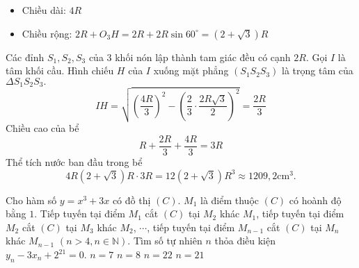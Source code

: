 \begin{ex}
{\begin{itemize}
\item Chiều dài: $4R$
\item Chiều rộng: $2R+O_3H=2R+2R\sin 60^ \circ=(2+ \sqrt{3})R$
\end{itemize}
Các đỉnh $S_1,S_2,S_3$ của $3$ khối nón lập thành tam giác đều có cạnh $2R$. Gọi $I$ là tâm khối cầu. Hình chiếu $H$ của $I$ xuống mặt phẳng $(S_1 S_2 S_3)$ là trọng tâm của $\Delta S_1 S_2 S_3.$\\
$$IH=\sqrt{\left( \dfrac{4R}{3}\right)^2- \left( \dfrac{2}{3}\cdot \dfrac{2R\sqrt{3}}{2}\right)^2}=\dfrac{2R}{3}$$
Chiều cao của bể $$R+\dfrac{2R}{3}+\dfrac{4R}{3}=3R$$
Thể tích nước ban đầu trong bể
$$4R(2+\sqrt{3})R \cdot 3R=12(2+\sqrt{3})R^3 \approx 1209{,}2 \mathrm{cm} ^3.$$
}
\end{ex}
\begin{ex}%
Cho hàm số $y=x^3+3x$ có đồ thị $(C)$. $M_1$ là điểm thuộc $(C)$ có hoành độ bằng $1$. Tiếp tuyến tại điểm $M_1$ cắt $(C)$ tại $M_2$ khác $M_1$, tiếp tuyến tại điểm $M_2$ cắt $(C)$ tại $M_3$ khác $M_2$, $\cdots$, tiếp tuyến tại điểm $M_{n-1}$ cắt $(C)$ tại $M_n$ khác $M_{n-1}$ $(n>4,n \in \mathbb{N})$. Tìm số tự nhiên $n$ thỏa điều kiện $y_n-3x_n+2^{21}=0.$
\choice
{$n=7$}
{\True $n=8$}
{$n=22$}
{$n=21$}
\end{ex}

